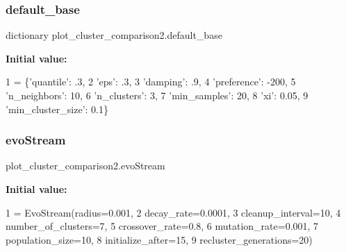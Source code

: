 \subsubsection{\texorpdfstring{default\+\_\+base}{default\_base}}
{\footnotesize\ttfamily dictionary plot\+\_\+cluster\+\_\+comparison2.\+default\+\_\+base}

{\bfseries Initial value\+:}
\begin{DoxyCode}
1 =  \{\textcolor{stringliteral}{'quantile'}: .3,
2                 \textcolor{stringliteral}{'eps'}: .3,
3                 \textcolor{stringliteral}{'damping'}: .9,
4                 \textcolor{stringliteral}{'preference'}: -200,
5                 \textcolor{stringliteral}{'n\_neighbors'}: 10,
6                 \textcolor{stringliteral}{'n\_clusters'}: 3,
7                 \textcolor{stringliteral}{'min\_samples'}: 20,
8                 \textcolor{stringliteral}{'xi'}: 0.05,
9                 \textcolor{stringliteral}{'min\_cluster\_size'}: 0.1\}
\end{DoxyCode}
\mbox{\label{namespaceplot__cluster__comparison2_aa49ace856f840f725b12cebedadc39c9}} 
\subsubsection{\texorpdfstring{evo\+Stream}{evoStream}}
{\footnotesize\ttfamily plot\+\_\+cluster\+\_\+comparison2.\+evo\+Stream}

{\bfseries Initial value\+:}
\begin{DoxyCode}
1 =  EvoStream(radius=0.001,
2                           decay\_rate=0.0001,
3                           cleanup\_interval=10,
4                           number\_of\_clusters=7,
5                           crossover\_rate=0.8,
6                           mutation\_rate=0.001,
7                           population\_size=10,
8                           initialize\_after=15,
9                           recluster\_generations=20)
\end{DoxyCode}
\mbox{\label{namespaceplot__cluster__comparison2_a457099a50edf0cc7fd7fbf8f74ae57df}} 
